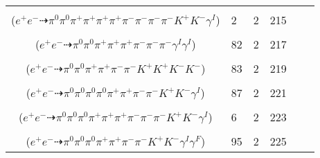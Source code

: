 \documentclass[landscape]{article}
\newcounter{rownumbers}
\newcommand\rn{\stepcounter{rownumbers}\arabic{rownumbers}}
\newcommand{\EOL}{\\} %
\newcommand{\topoTags}[1]{#1} %
\begin{document}
\begin{longtable}{clcccc}
\rn & \makecell[l]{ $ 
e^{+} e^{-} \rightarrow \pi^{+} \pi^{+} \pi^{+} \pi^{-} \rho^{-} \omega K^{*} K^{-} \gamma^{I} ,
\rho^{-} \rightarrow \pi^{0} \pi^{-} ,
\omega \rightarrow \pi^{0} \pi^{+} \pi^{-} ,
K^{*} \rightarrow \pi^{-} K^{+} 
$ \\ ($
e^{+} e^{-} \dashrightarrow \pi^{0} \pi^{0} \pi^{+} \pi^{+} \pi^{+} \pi^{+} \pi^{-} \pi^{-} \pi^{-} \pi^{-} K^{+} K^{-} \gamma^{I} 
$) } & \topoTags{2 & }2 & 215 \EOL

\rn & \makecell[l]{ $ 
e^{+} e^{-} \rightarrow \pi^{0} \rho^{0} \pi^{+} \pi^{+} \pi^{-} \rho^{-} \gamma^{I} \gamma^{I} ,
\rho^{0} \rightarrow \pi^{+} \pi^{-} ,
\rho^{-} \rightarrow \pi^{0} \pi^{-} 
$ \\ ($
e^{+} e^{-} \dashrightarrow \pi^{0} \pi^{0} \pi^{+} \pi^{+} \pi^{+} \pi^{-} \pi^{-} \pi^{-} \gamma^{I} \gamma^{I} 
$) } & \topoTags{82 & }2 & 217 \EOL

\rn & \makecell[l]{ $ 
e^{+} e^{-} \rightarrow \pi^{0} \pi^{+} \pi^{-} \pi^{-} \rho^{+} K^{+} K^{-} \phi ,
\rho^{+} \rightarrow \pi^{0} \pi^{+} ,
\phi \rightarrow K^{+} K^{-} 
$ \\ ($
e^{+} e^{-} \dashrightarrow \pi^{0} \pi^{0} \pi^{+} \pi^{+} \pi^{-} \pi^{-} K^{+} K^{+} K^{-} K^{-} 
$) } & \topoTags{83 & }2 & 219 \EOL

\rn & \makecell[l]{ $ 
e^{+} e^{-} \rightarrow \pi^{0} \pi^{0} \pi^{+} \pi^{+} \rho^{-} \rho^{-} K^{+} K^{-} \gamma^{I} ,
\rho^{-} \rightarrow \pi^{0} \pi^{-} ,
\rho^{-} \rightarrow \pi^{0} \pi^{-} 
$ \\ ($
e^{+} e^{-} \dashrightarrow \pi^{0} \pi^{0} \pi^{0} \pi^{0} \pi^{+} \pi^{+} \pi^{-} \pi^{-} K^{+} K^{-} \gamma^{I} 
$) } & \topoTags{87 & }2 & 221 \EOL

\rn & \makecell[l]{ $ 
e^{+} e^{-} \rightarrow \pi^{0} \pi^{0} \pi^{+} \pi^{+} \pi^{-} \omega K^{*} K^{-} \gamma^{I} ,
\omega \rightarrow \pi^{0} \pi^{+} \pi^{-} ,
K^{*} \rightarrow \pi^{-} K^{+} 
$ \\ ($
e^{+} e^{-} \dashrightarrow \pi^{0} \pi^{0} \pi^{0} \pi^{+} \pi^{+} \pi^{+} \pi^{-} \pi^{-} \pi^{-} K^{+} K^{-} \gamma^{I} 
$) } & \topoTags{6 & }2 & 223 \EOL

\rn & \makecell[l]{ $ 
e^{+} e^{-} \rightarrow \pi^{0} \pi^{0} \pi^{+} \pi^{+} \pi^{-} \rho^{-} K^{+} K^{-} \gamma^{I} ,
\rho^{-} \rightarrow \pi^{0} \pi^{-} \gamma^{F} 
$ \\ ($
e^{+} e^{-} \dashrightarrow \pi^{0} \pi^{0} \pi^{0} \pi^{+} \pi^{+} \pi^{-} \pi^{-} K^{+} K^{-} \gamma^{I} \gamma^{F} 
$) } & \topoTags{95 & }2 & 225 \EOL


\end{longtable}
\end{document}
